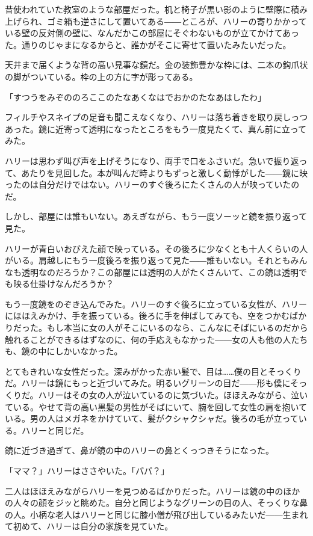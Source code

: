 \documentclass[10pt,a4paper]{article}
\begin{document}
\begin{CJK}{UTF8}{min}
昔使われていた教室のような部屋だった。机と椅子が黒い影のように壁際に積み上げられ、ゴミ箱も逆さにして置いてある――ところが、ハリーの寄りかかっている壁の反対側の壁に、なんだかこの部屋にそぐわないものが立てかけてあった。通りのじゃまになるからと、誰かがそこに寄せて置いたみたいだった。

天井まで届くような背の高い見事な鏡だ。金の装飾豊かな枠には、二本の鈎爪状の脚がついている。枠の上の方に字が彫ってある。

「すつうをみぞののろここのたなあくなはでおかのたなあはしたわ」

フィルチやスネイプの足音も聞こえなくなり、ハリーは落ち着きを取り戻しっつあった。鏡に近寄って透明になったところをもう一度見たくて、真ん前に立ってみた。

ハリーは思わず叫び声を上げそうになり、両手で口をふさいだ。急いで振り返って、あたりを見回した。本が叫んだ時よりもずっと激しく動悸がした――鏡に映ったのは自分だけではない。ハリーのすぐ後ろにたくさんの人が映っていたのだ。

しかし、部屋には誰もいない。あえぎながら、もう一度ソーッと鏡を振り返って見た。

ハリーが青白いおびえた顔で映っている。その後ろに少なくとも十人くらいの人がいる。肩越しにもう一度後ろを振り返って見た――誰もいない。それともみんなも透明なのだろうか？この部屋には透明の人がたくさんいて、この鏡は透明でも映る仕掛けなんだろうか？

もう一度鏡をのぞき込んでみた。ハリーのすぐ後ろに立っている女性が、ハリーにほほえみかけ、手を振っている。後ろに手を伸ばしてみても、空をつかむばかりだった。もし本当に女の人がそこにいるのなら、こんなにそばにいるのだから触れることができるはずなのに、何の手応えもなかった――女の人も他の人たちも、鏡の中にしかいなかった。

とてもきれいな女性だった。深みがかった赤い髪で、目は……僕の目とそっくりだ。ハリーは鏡にもっと近づいてみた。明るいグリーンの目だ――形も僕にそっくりだ。ハリーはその女の人が泣いているのに気づいた。ほほえみながら、泣いている。やせて背の高い黒髪の男性がそばにいて、腕を回して女性の肩を抱いている。男の人はメガネをかけていて、髪がクシャクシャだ。後ろの毛が立っている。ハリーと同じだ。

鏡に近づき過ぎて、鼻が鏡の中のハリーの鼻とくっつきそうになった。

「ママ？」ハリーはささやいた。「パパ？」

二人はほほえみながらハリーを見つめるばかりだった。ハリーは鏡の中のほかの人々の顔をジッと眺めた。自分と同じようなグリーンの目の人、そっくりな鼻の人。小柄な老人はハリーと同じに膝小僧が飛び出しているみたいだ――生まれて初めて、ハリーは自分の家族を見ていた。


\end{CJK}
\end{document}
